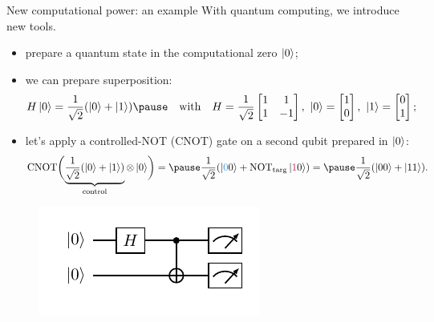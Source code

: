 \documentclass[aspectratio=169, 8pt, xcolor={svgnames}, hyperref={linkcolor=black}]{beamer}
\begin{document}
\begin{frame}{New computational power: an example}
\pause
With quantum computing, we introduce new tools.
\pause
\begin{itemize}[noitemsep]
\item[\faRocket] prepare a quantum state in the computational zero $\ket{0}$;
\pause
\item[\faSliders] we can prepare superposition:
$$H\ket{0} = \frac{1}{\sqrt{2}}(\ket{0} + \ket{1}) \pause \quad \text{with} \quad H = \frac{1}{\sqrt{2}}
\begin{bmatrix} 1 & 1 \\ 1 & -1 \end{bmatrix},\,\, \ket{0}=\begin{bmatrix} 1 \\ 0
\end{bmatrix},\,\,\ket{1}=\begin{bmatrix} 0 \\ 1 \end{bmatrix};$$
\pause
\item[\faShareAlt] let's apply a controlled-NOT (CNOT) gate on a second qubit prepared in $\ket{0}$:
$$ \text{CNOT} \biggl( \underbrace{\frac{1}{\sqrt{2}}(\ket{0} + \ket{1})}_{\text{control}}\otimes
\ket{0} \biggr) = \pause \frac{1}{\sqrt{2}}(\ket{\textcolor{bleudefrance}{0}0} +
\text{NOT}_{\rm targ}\ket{\textcolor{brightmaroon}{1}0}) = \pause \frac{1}{\sqrt{2}}(\ket{00} + \ket{11}). $$
\end{itemize}
\pause
\vspace{-0.5cm}
\begin{figure}
   \includegraphics[width=0.4\linewidth]{figures/baby3.pdf}
\end{figure}
\end{frame}
\end{document}
